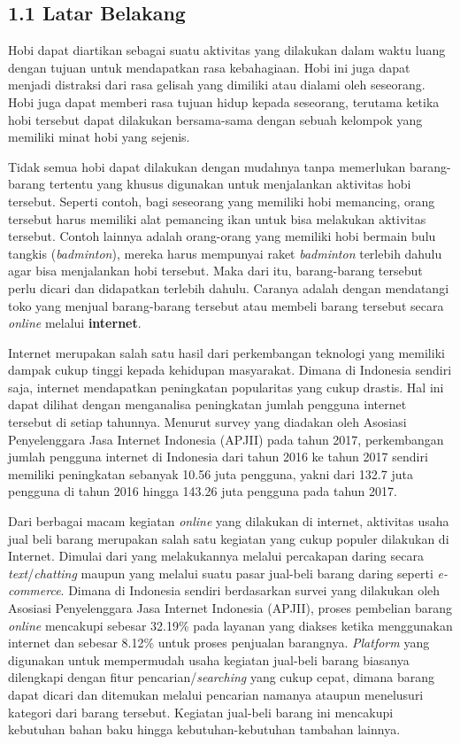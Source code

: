 \documentclass[a4paper]{article}
\newcommand{\subbab}[1]{%
    \subsection*{#1}%
    \addcontentsline{toc}{subsection}{\protect\numberline{}#1}%
}
\begin{document}
\subbab{1.1 Latar Belakang}

Hobi dapat diartikan sebagai suatu aktivitas yang dilakukan dalam waktu luang dengan tujuan untuk mendapatkan rasa kebahagiaan. Hobi ini juga dapat menjadi distraksi dari rasa gelisah yang dimiliki atau dialami oleh seseorang. Hobi juga dapat memberi rasa tujuan hidup kepada seseorang, terutama ketika hobi tersebut dapat dilakukan bersama-sama dengan sebuah kelompok yang memiliki minat hobi yang sejenis\autocite{zaidi2022passion}.

Tidak semua hobi dapat dilakukan dengan mudahnya tanpa memerlukan barang-barang tertentu yang khusus digunakan untuk menjalankan aktivitas hobi tersebut. Seperti contoh, bagi seseorang yang memiliki hobi memancing, orang tersebut harus memiliki alat pemancing ikan untuk bisa melakukan aktivitas tersebut. Contoh lainnya adalah orang-orang yang memiliki hobi bermain bulu tangkis (\textit{badminton}), mereka harus mempunyai raket \textit{badminton} terlebih dahulu agar bisa menjalankan hobi tersebut. Maka dari itu, barang-barang tersebut perlu dicari dan didapatkan terlebih dahulu. Caranya adalah dengan mendatangi toko yang menjual barang-barang tersebut atau membeli barang tersebut secara \textit{online} melalui \textbf{internet}.

Internet merupakan salah satu hasil dari perkembangan teknologi yang memiliki dampak cukup tinggi kepada kehidupan masyarakat. Dimana di Indonesia sendiri saja, internet mendapatkan peningkatan popularitas yang cukup drastis. Hal ini dapat dilihat dengan menganalisa peningkatan jumlah pengguna internet tersebut di setiap tahunnya. Menurut survey yang diadakan oleh Asosiasi Penyelenggara Jasa Internet Indonesia (APJII) pada tahun 2017, perkembangan jumlah pengguna internet di Indonesia dari tahun 2016 ke tahun 2017 sendiri memiliki peningkatan sebanyak 10.56 juta pengguna, yakni dari 132.7 juta pengguna di tahun 2016 hingga 143.26 juta pengguna pada tahun 2017\autocite{indonesia2017infografis}.

Dari berbagai macam kegiatan \textit{online} yang dilakukan di internet, aktivitas usaha jual beli barang merupakan salah satu kegiatan yang cukup populer dilakukan di Internet. Dimulai dari yang melakukannya melalui percakapan daring secara \textit{text}/\textit{chatting} maupun yang melalui suatu pasar jual-beli barang daring seperti \textit{e-commerce}. Dimana di Indonesia sendiri berdasarkan survei yang dilakukan oleh Asosiasi Penyelenggara Jasa Internet Indonesia (APJII), proses pembelian barang \textit{online} mencakupi sebesar 32.19\% pada layanan yang diakses ketika menggunakan internet dan sebesar 8.12\% untuk proses penjualan barangnya\autocite{indonesia2017infografis}. \textit{Platform} yang digunakan untuk mempermudah usaha kegiatan jual-beli barang biasanya dilengkapi dengan fitur pencarian/\textit{searching} yang cukup cepat, dimana barang dapat dicari dan ditemukan melalui pencarian namanya ataupun menelusuri kategori dari barang tersebut. Kegiatan jual-beli barang ini mencakupi kebutuhan bahan baku hingga kebutuhan-kebutuhan tambahan lainnya.
\end{document}
